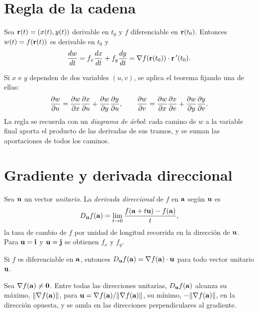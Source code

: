 \addtocounter{definicion}{1}%

\section{Regla de la cadena}

\begin{teorema}\label{teo:cadena}
Sea $\mathbf{r}(t)=(x(t),y(t))$ derivable en $t_0$ y $f$ diferenciable en $\mathbf{r}(t_0)$. Entonces $w(t)=f(\mathbf{r}(t))$ es derivable en $t_0$ y
\[
\frac{dw}{dt}=f_x\frac{dx}{dt}+f_y\frac{dy}{dt}=\nabla f(\mathbf{r}(t_0))\cdot\mathbf{r}\,'(t_0).
\]
\end{teorema}

Si $x$ e $y$ dependen de dos variables $(u,v)$, se aplica el teorema fijando una de ellas:
\begin{equation}\label{eq:t4-cadena2}
\frac{\partial w}{\partial u}=\frac{\partial w}{\partial x}\frac{\partial x}{\partial u}+\frac{\partial w}{\partial y}\frac{\partial y}{\partial u},\qquad \frac{\partial w}{\partial v}=\frac{\partial w}{\partial x}\frac{\partial x}{\partial v}+\frac{\partial w}{\partial y}\frac{\partial y}{\partial v} .
\end{equation}
La regla se recuerda con un \emph{diagrama de árbol}: cada camino de $w$ a la variable final aporta el producto de las derivadas de sus tramos, y se suman las aportaciones de todos los caminos.

\addtocounter{figure}{1}%

\addtocounter{definicion}{1}%

\section{Gradiente y derivada direccional}

\begin{definicion}\label{def:direccional}
Sea $\mathbf{u}$ un vector \emph{unitario}. La \emph{derivada direccional} de $f$ en $\mathbf{a}$ según $\mathbf{u}$ es
\[
D_{\mathbf{u}}f(\mathbf{a})=\lim_{t\to0}\frac{f(\mathbf{a}+t\mathbf{u})-f(\mathbf{a})}{t},
\]
la tasa de cambio de $f$ por unidad de longitud recorrida en la dirección de $\mathbf{u}$. Para $\mathbf{u}=\mathbf{i}$ y $\mathbf{u}=\mathbf{j}$ se obtienen $f_x$ y $f_y$.
\end{definicion}

\begin{teorema}\label{teo:direccional}
Si $f$ es diferenciable en $\mathbf{a}$, entonces $D_{\mathbf{u}}f(\mathbf{a})=\nabla f(\mathbf{a})\cdot\mathbf{u}$ para todo vector unitario $\mathbf{u}$.
\end{teorema}

\begin{corolario}\label{cor:maximo-crecimiento}
Sea $\nabla f(\mathbf{a})\neq\mathbf{0}$. Entre todas las direcciones unitarias, $D_{\mathbf{u}}f(\mathbf{a})$ alcanza su máximo, $\lVert\nabla f(\mathbf{a})\rVert$, para $\mathbf{u}=\nabla f(\mathbf{a})/\lVert\nabla f(\mathbf{a})\rVert$, su mínimo, $-\lVert\nabla f(\mathbf{a})\rVert$, en la dirección opuesta, y se anula en las direcciones perpendiculares al gradiente.
\end{corolario}

